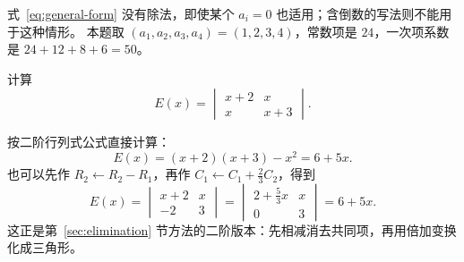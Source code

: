 \documentclass[UTF8,12pt,a4paper,fontset=fandol]{ctexart}
\begin{document}
式~\eqref{eq:general-form} 没有除法，即使某个 $a_i=0$ 也适用；含倒数的写法则不能用于这种情形。
本题取 $(a_1,a_2,a_3,a_4)=(1,2,3,4)$，常数项是 $24$，一次项系数是 $24+12+8+6=50$。

\begin{example}[先用低阶题练习]
计算
\[
  E(x)=\begin{vmatrix}x+2&x\\x&x+3\end{vmatrix}.
\]
\end{example}
\begin{solve}
按二阶行列式公式直接计算：
\[
  E(x)=(x+2)(x+3)-x^2=6+5x.
\]
也可以先作 $R_2\leftarrow R_2-R_1$，再作 $C_1\leftarrow C_1+\frac23C_2$，得到
\[
  E(x)=\begin{vmatrix}x+2&x\\-2&3\end{vmatrix}
  =\begin{vmatrix}2+\frac53x&x\\0&3\end{vmatrix}
  =6+5x.
\]
这正是第~\ref{sec:elimination} 节方法的二阶版本：先相减消去共同项，再用倍加变换化成三角形。
\end{solve}
\end{document}
